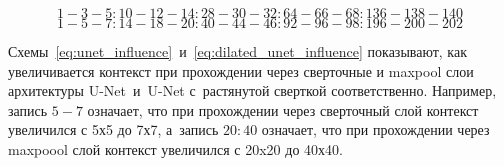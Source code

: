 \begin{equation} 
\label{eq:unet_influence}
1-3-5:10-12-14:28-30-32:64-66-68:136-138-140
\end{equation}
\begin{equation} 
\label{eq:dilated_unet_influence}
1-5-7:14-18-20:40-44-46:92-96-98:196-200-202
\end{equation}

Схемы~\ref{eq:unet_influence}~и~\ref{eq:dilated_unet_influence} показывают, как увеличивается контекст при прохождении через сверточные и maxpool слои архитектуры U-Net~и~U-Net с~растянутой сверткой соответственно. Например, запись $5-7$ означает, что при прохождении через сверточный слой контекст увеличился с 5х5 до 7х7, а~запись $20:40$ означает, что при прохождении через maxpoool слой контекст увеличился с 20x20 до 40х40.

